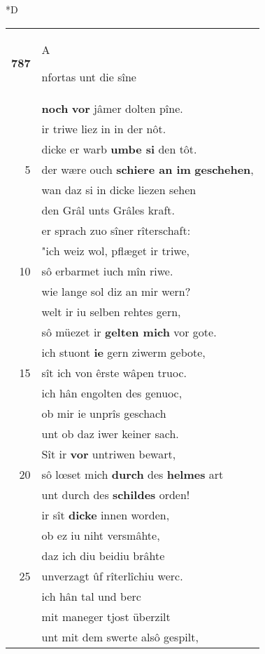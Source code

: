 \documentclass[8pt,a4paper,notitlepage]{article}
\begin{document}
\begin{table}[ht]
\begin{minipage}[t]{0.5\linewidth}
\small
\begin{center}*D
\end{center}
\begin{tabular}{rl}
\textbf{787} & \begin{Large}A\end{Large}nfortas unt die sîne\\ 
 & \textbf{noch} \textbf{vor} jâmer dolten pîne.\\ 
 & ir triwe liez in in der nôt.\\ 
 & dicke er warb \textbf{umbe si} den tôt.\\ 
5 & der wære ouch \textbf{schiere an im} \textbf{geschehen},\\ 
 & wan daz si in dicke liezen sehen\\ 
 & den Grâl unts Grâles kraft.\\ 
 & er sprach zuo sîner rîterschaft:\\ 
 & "ich weiz wol, pflæget ir triwe,\\ 
10 & sô erbarmet iuch mîn riwe.\\ 
 & wie lange sol diz an mir wern?\\ 
 & welt ir iu selben rehtes gern,\\ 
 & sô müezet ir \textbf{gelten mich} vor gote.\\ 
 & ich stuont \textbf{ie} gern ziwerm gebote,\\ 
15 & sît ich von êrste wâpen truoc.\\ 
 & ich hân engolten des genuoc,\\ 
 & ob mir ie unprîs geschach\\ 
 & unt ob daz iwer keiner sach.\\ 
 & Sît ir \textbf{vor} untriwen bewart,\\ 
20 & sô lœset mich \textbf{durch} des \textbf{helmes} art\\ 
 & unt durch des \textbf{schildes} orden!\\ 
 & ir sît \textbf{dicke} innen worden,\\ 
 & ob ez iu niht versmâhte,\\ 
 & daz ich diu beidiu brâhte\\ 
25 & unverzagt ûf rîterlîchiu werc.\\ 
 & ich hân tal und berc\\ 
 & mit maneger tjost überzilt\\ 
 & unt mit dem swerte alsô gespilt,\\ 

\end{tabular}
\end{minipage}
\end{table}
\end{document}
